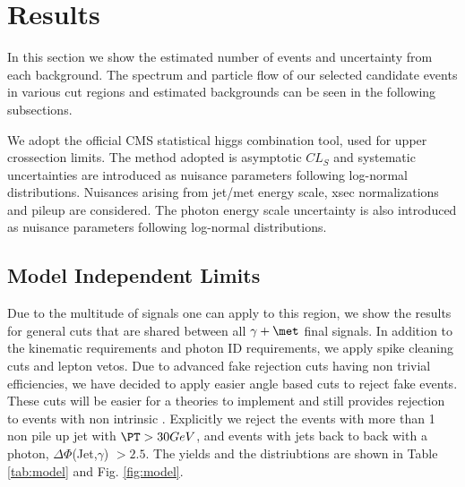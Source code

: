 \section{Results}
\label{sec:results}

In this section we show the estimated number of events and uncertainty from each background. The \pt spectrum and particle flow \met of our selected candidate events in various cut regions and estimated backgrounds can be seen in the following subsections.


We adopt the official CMS statistical higgs combination tool\cite{higgstool}, used for upper crossection limits. The method adopted is asymptotic $CL_S$ \cite{CLs} and systematic uncertainties are introduced as nuisance parameters following log-normal distributions. Nuisances arising from jet/met energy scale, xsec normalizations and pileup are considered. The photon energy scale uncertainty is also introduced as nuisance parameters following log-normal distributions. 


\subsection{Model Independent Limits} \label{sec:shared}
Due to the multitude of signals one can apply to this region, we show the results for general cuts that are shared between all $\gamma + \met$ final signals. In addition to the kinematic requirements and photon ID requirements, we apply spike cleaning cuts and lepton vetos. Due to advanced fake \met rejection cuts having non trivial efficiencies, we have decided to apply easier angle based cuts to reject fake \met events. These cuts will be easier for a theories to implement and still provides rejection to events with non intrinsic \met. Explicitly we reject the events with more than 1 non pile up jet with $\PT>30 GeV$, and events with jets back to back with a photon, $\Delta\Phi$(Jet,$\gamma$) $> 2.5$. The yields and the distriubtions are shown in Table \ref{tab:model} and Fig. \ref{fig:model}.



